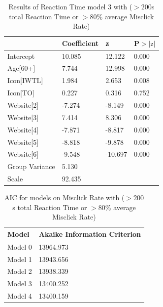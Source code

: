 \documentclass[12pt,twoside]{reedthesis}
\begin{document}
\begin{table}[h!]
        \centering
        \begin{tabular}{| p{5cm} | p{2.5cm} | p{2.5cm} | p{2.5cm} |}
            \hline
            & Coefficient & z & P$>|\text{z}|$\\
            \hline
            Intercept & 10.085 & 12.122 & 0.000\\
            \hline
            Age[60+] & 7.744 & 12.998 & 0.000\\
            \hline
            Icon[IWTL] & 1.984 & 2.653 & 0.008\\
            \hline
            Icon[TO] & 0.227 & 0.316 & 0.752\\
            \hline
            Website[2] & -7.274 & -8.149 & 0.000\\
            \hline
            Website[3] & 7.414 & 8.306 & 0.000\\
            \hline
            Website[4] & -7.871 & -8.817 & 0.000\\
            \hline
            Website[5] & -8.818 & -9.878 & 0.000\\
            \hline
            Website[6] & -9.548 & -10.697 & 0.000\\
            \hline
            Group Variance & 5.130 &&\\
            \hline
            Scale & 92.435 &&\\
            \hline
        \end{tabular}
        \caption{Results of Reaction Time model 3 with ($>200$s total Reaction Time or $>80$\% average Misclick Rate)}
    \end{table} 

\begin{table}[h!]
        \centering
        \begin{tabular}{| p{3.5cm} | p{7.5cm} |}
            \hline
            Model & Akaike Information Criterion\\
            \hline
            Model 0 & 13964.973\\
            \hline
            Model 1 & 13943.656\\
            \hline
            Model 2 & 13938.339\\
            \hline
            Model 3 & 13400.252\\
            \hline
            Model 4 & 13400.159\\
            \hline
        \end{tabular}
        \caption{AIC for models on Misclick Rate with ($>200$s total Reaction Time or $>80$\% average Misclick Rate)}
    \end{table}
\end{document}
